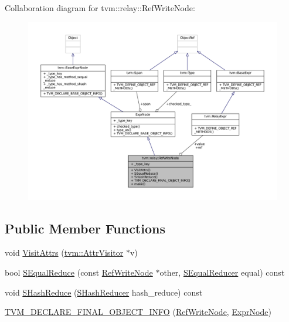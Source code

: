 Collaboration diagram for tvm\+:\+:relay\+:\+:Ref\+Write\+Node\+:
\nopagebreak
\begin{figure}[H]
\begin{center}
\leavevmode
\includegraphics[width=350pt]{classtvm_1_1relay_1_1RefWriteNode__coll__graph}
\end{center}
\end{figure}
\subsection*{Public Member Functions}
\begin{DoxyCompactItemize}
\item 
void \hyperlink{classtvm_1_1relay_1_1RefWriteNode_af894f05a511c8232ce44f7f5e7d5f895}{Visit\+Attrs} (\hyperlink{classtvm_1_1AttrVisitor}{tvm\+::\+Attr\+Visitor} $\ast$v)
\item 
bool \hyperlink{classtvm_1_1relay_1_1RefWriteNode_a86378ddf1987a7b3f01831e470c06f27}{S\+Equal\+Reduce} (const \hyperlink{classtvm_1_1relay_1_1RefWriteNode}{Ref\+Write\+Node} $\ast$other, \hyperlink{classtvm_1_1SEqualReducer}{S\+Equal\+Reducer} equal) const 
\item 
void \hyperlink{classtvm_1_1relay_1_1RefWriteNode_aee1abb52a5f1b9a2e397c16be146d15d}{S\+Hash\+Reduce} (\hyperlink{classtvm_1_1SHashReducer}{S\+Hash\+Reducer} hash\+\_\+reduce) const 
\item 
\hyperlink{classtvm_1_1relay_1_1RefWriteNode_a8ddb9e9f64b00d8914916d8c572d253c}{T\+V\+M\+\_\+\+D\+E\+C\+L\+A\+R\+E\+\_\+\+F\+I\+N\+A\+L\+\_\+\+O\+B\+J\+E\+C\+T\+\_\+\+I\+N\+FO} (\hyperlink{classtvm_1_1relay_1_1RefWriteNode}{Ref\+Write\+Node}, \hyperlink{namespacetvm_1_1relay_a387f18e050d016c52ea6c4781e7cff6c}{Expr\+Node})
\end{DoxyCompactItemize}

